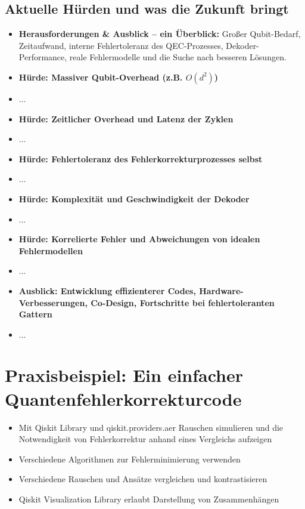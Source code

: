 \subsection{Aktuelle Hürden und was die Zukunft bringt}
\begin{itemize}
    \item \textbf{Herausforderungen \& Ausblick -- ein Überblick:} Großer Qubit-Bedarf, Zeitaufwand, interne Fehlertoleranz des QEC-Prozesses, Dekoder-Performance, reale Fehlermodelle und die Suche nach besseren Lösungen.
    \item \textbf{Hürde: Massiver Qubit-Overhead (z.B. $O(d^2)$)}
    \item ...
    \item \textbf{Hürde: Zeitlicher Overhead und Latenz der Zyklen}
    \item ...
    \item \textbf{Hürde: Fehlertoleranz des Fehlerkorrekturprozesses selbst}
    \item ...
    \item \textbf{Hürde: Komplexität und Geschwindigkeit der Dekoder}
    \item ...
    \item \textbf{Hürde: Korrelierte Fehler und Abweichungen von idealen Fehlermodellen}
    \item ...
    \item \textbf{Ausblick: Entwicklung effizienterer Codes, Hardware-Verbesserungen, Co-Design, Fortschritte bei fehlertoleranten Gattern}
    \item ...
\end{itemize}

\section{Praxisbeispiel: Ein einfacher Quantenfehlerkorrekturcode}
\begin{itemize}
    \item Mit Qiskit Library und qiskit.providers.aer Rauschen simulieren und die Notwendigkeit von Fehlerkorrektur anhand eines Vergleichs aufzeigen
    \item Verschiedene Algorithmen zur Fehlerminimierung verwenden
    \item Verschiedene Rauschen und Ansätze vergleichen und kontrastisieren
    \item Qiskit Visualization Library erlaubt Darstellung von Zusammenhängen
\end{itemize}



\printbibliography
